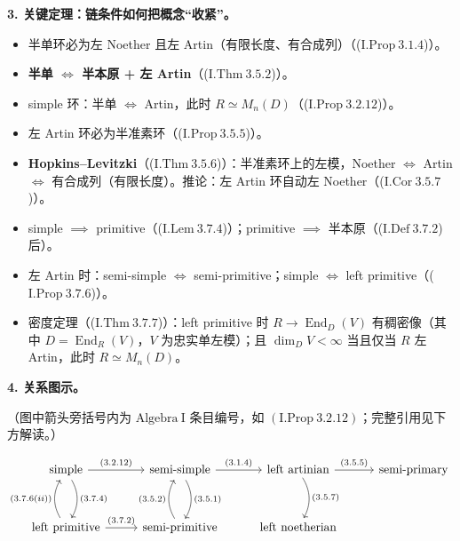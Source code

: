 \documentclass[a4paper]{ctexart}
\theoremstyle{definition}
\theoremstyle{analysis}
\theoremstyle{plain}
\begin{document}
\medskip

\textbf{3. 关键定理：链条件如何把概念“收紧”。}

\begin{itemize}
  \item 半单环必为左 Noether 且左 Artin（有限长度、有合成列）（(\(\mathrm{I.Prop}\ 3.1.4\))）。
  \item \textbf{半单 \(\iff\) 半本原 + 左 Artin}（(\(\mathrm{I.Thm}\ 3.5.2\))）。
  \item simple 环：半单 \(\iff\) Artin，此时 \(R\simeq M_n(D)\)（(\(\mathrm{I.Prop}\ 3.2.12\))）。
  \item 左 Artin 环必为半准素环（(\(\mathrm{I.Prop}\ 3.5.5\))）。
  \item \textbf{Hopkins--Levitzki}（(\(\mathrm{I.Thm}\ 3.5.6\))）：半准素环上的左模，Noether \(\iff\) Artin \(\iff\) 有合成列（有限长度）。推论：左 Artin 环自动左 Noether（(\(\mathrm{I.Cor}\ 3.5.7\))）。
  \item simple \(\implies\) primitive（(\(\mathrm{I.Lem}\ 3.7.4\))）；primitive \(\implies\) 半本原（(\(\mathrm{I.Def}\ 3.7.2\)) 后）。
  \item 左 Artin 时：semi-simple \(\iff\) semi-primitive；simple \(\iff\) left primitive（(\(\mathrm{I.Prop}\ 3.7.6\))）。
  \item 密度定理（(\(\mathrm{I.Thm}\ 3.7.7\))）：left primitive 时 \(R\to \operatorname{End}_D(V)\) 有稠密像（其中 \(D=\operatorname{End}_R(V)\)，\(V\) 为忠实单左模）；且 \(\dim_D V<\infty\) 当且仅当 \(R\) 左 Artin，此时 \(R\simeq M_n(D)\)。
\end{itemize}

\medskip

\textbf{4. 关系图示。}

（图中箭头旁括号内为 \(\mathrm{Algebra\ I}\) 条目编号，如 \((\mathrm{I.Prop}\ 3.2.12)\)；完整引用见下方解读。）

\[
\begin{tikzcd}[column sep=2.7em, row sep=3.2em]
  \text{simple} \arrow[r, "{\scriptstyle (3.2.12)}"] \arrow[d, bend left, "{\scriptstyle (3.7.4)}"] 
  & \text{semi-simple} \arrow[r, "{\scriptstyle (3.1.4)}"] \arrow[d, bend left, "{\scriptstyle (3.5.1)}"] 
  & \text{left artinian} \arrow[r, "{\scriptstyle (3.5.5)}"] \arrow[d, bend left, "{\scriptstyle (3.5.7)}"] 
  & \text{semi-primary} \\
  \text{left primitive} \arrow[r, "{\scriptstyle (3.7.2)}"] \arrow[u, bend left, "{\scriptstyle (3.7.6(ii))}"] 
  & \text{semi-primitive} \arrow[u, bend left, "{\scriptstyle (3.5.2)}"] 
  & \text{left noetherian} 
  & {}
\end{tikzcd}
\]
\end{document}
